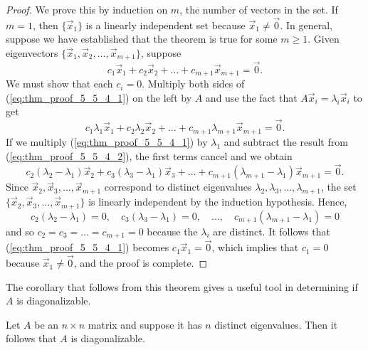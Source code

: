 \documentclass{ximera}
\begin{document}
\begin{proof}
We prove this by induction on $m$, the number of vectors in the set. If $m = 1$, then $\{\vec{x}_{1}\}$ is a linearly independent set because $\vec{x}_{1} \neq \vec{0}$. In general, suppose we have established that the theorem is true for some $m \geq 1$. Given eigenvectors $\{\vec{x}_{1}, \vec{x}_{2}, \dots, \vec{x}_{m+1}\}$, suppose
\begin{equation}
\label{eq:thm_proof_5_5_4_1}
c_1\vec{x}_1 + c_2\vec{x}_2 + \dots + c_{m+1}\vec{x}_{m+1} = \vec{0}.
\end{equation}
We must show that each $c_{i} = 0$. Multiply both sides of (\ref{eq:thm_proof_5_5_4_1}) on the left by $A$ and use the fact that $A\vec{x}_{i} = \lambda_{i}\vec{x}_{i}$ to get
\begin{equation}
\label{eq:thm_proof_5_5_4_2}
c_1\lambda_1\vec{x}_1 + c_2\lambda_2\vec{x}_2 + \dots + c_{m+1}\lambda_{m+1}\vec{x}_{m+1} = \vec{0}.
\end{equation}
If we multiply (\ref{eq:thm_proof_5_5_4_1}) by $\lambda_{1}$ and subtract the result from (\ref{eq:thm_proof_5_5_4_2}), the first terms cancel and we obtain
\begin{equation*}
c_2(\lambda_2 - \lambda_1)\vec{x}_2 + c_3(\lambda_3 - \lambda_1)\vec{x}_3 + \dots + c_{m+1}(\lambda_{m+1} - \lambda_1)\vec{x}_{m+1} = \vec{0}.
\end{equation*}
Since $\vec{x}_{2}, \vec{x}_{3}, \dots, \vec{x}_{m+1}$
correspond to distinct eigenvalues $\lambda_{2}, \lambda_{3}, \dots, \lambda_{m+1}$, the set $\{\vec{x}_{2}, \vec{x}_{3}, \dots, \vec{x}_{m+1}\}$ is linearly independent by the induction hypothesis. Hence,
\begin{equation*}
c_2(\lambda_2 - \lambda_1) = 0, \quad c_3(\lambda_3 - \lambda_1) = 0, \quad \dots, \quad c_{m+1}(\lambda_{m+1} - \lambda_1) = 0
\end{equation*}
and so $c_{2} = c_{3} = \dots = c_{m+1} = 0$ because the $\lambda_{i}$ are distinct. It follows that (\ref{eq:thm_proof_5_5_4_1}) becomes $c_{1}\vec{x}_{1} = \vec{0}$, which implies that $c_{1} = 0$ because $\vec{x}_{1} \neq \vec{0}$, and the proof is complete. 
\end{proof}

The corollary that follows from this theorem gives a useful tool in determining if $A$ is diagonalizable.

\begin{corollary}\label{th:distincteigenvalues}
Let $A$ be an $n \times n$ matrix and suppose it has $n$ distinct eigenvalues. Then it follows that $A$ is diagonalizable.
\end{corollary}
\end{document}
